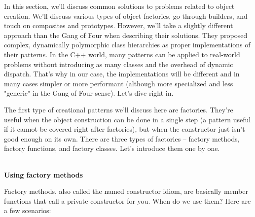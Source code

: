 
In this section, we'll discuss common solutions to problems related to object creation. We'll discuss various types of object factories, go through builders, and touch on composites and prototypes. However, we'll take a slightly different approach than the Gang of Four when describing their solutions. They proposed complex, dynamically polymorphic class hierarchies as proper implementations of their patterns. In the C++ world, many patterns can be applied to real-world problems without introducing as many classes and the overhead of dynamic dispatch. That's why in our case, the implementations will be different and in many cases simpler or more performant (although more specialized and less "generic" in the Gang of Four sense). Let's dive right in.


The first type of creational patterns we'll discuss here are factories. They're useful when the object construction can be done in a single step (a pattern useful if it cannot be covered right after factories), but when the constructor just isn't good enough on its own. There are three types of factories – factory methods, factory functions, and factory classes. Let's introduce them one by one.

\hspace*{\fill} \\ %
\noindent
\textbf{Using factory methods}

Factory methods, also called the named constructor idiom, are basically member functions that call a private constructor for you. When do we use them? Here are a few scenarios:


